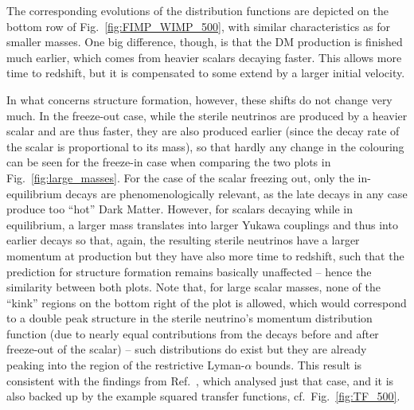 The corresponding evolutions of the distribution functions are depicted on the bottom row of Fig.~\ref{fig:FIMP_WIMP_500}, with similar characteristics as for smaller masses. One big difference, though, is that the DM production is finished much earlier, which comes from heavier scalars decaying faster. This allows more time to redshift, but it is compensated to some extend by a larger initial velocity.

In what concerns structure formation, however, these shifts do not change very much. In the freeze-out case, while the sterile neutrinos are produced by a heavier scalar and are thus faster, they are also produced earlier (since the decay rate of the scalar is proportional to its mass), so that hardly any change in the colouring can be seen for the freeze-in case when comparing the two plots in Fig.~\ref{fig:large_masses}. For the case of the scalar freezing out,  only the in-equilibrium decays are phenomenologically relevant, as the late decays in any case produce too ``hot'' Dark Matter. However, for scalars decaying while in equilibrium, a larger mass translates into larger Yukawa couplings and thus into earlier decays so that, again, the resulting sterile neutrinos have a larger momentum at production but they have also more time to redshift, such that the prediction for structure formation remains basically unaffected -- hence the similarity between both plots. Note that, for large scalar masses, none of the ``kink'' regions on the bottom right of the plot is allowed, which would correspond to a double peak structure in the sterile neutrino's momentum distribution function (due to nearly equal contributions from the decays before and after freeze-out of the scalar) -- such distributions do exist but they are already peaking into the region of the restrictive Lyman-$\alpha$ bounds. This result is consistent with the findings from Ref.~\cite{Merle:2015oja}, which analysed just that case, and it is also backed up by the example squared transfer functions, cf.\ Fig.~\ref{fig:TF_500}.
